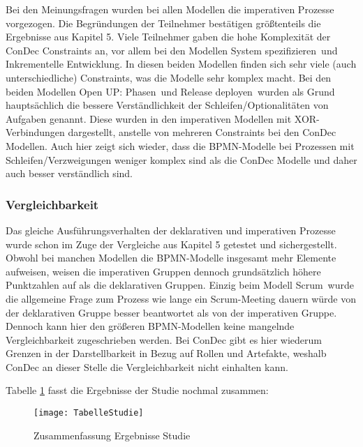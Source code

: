 Bei den Meinungsfragen wurden bei allen Modellen die imperativen Prozesse vorgezogen. Die Begründungen der Teilnehmer bestätigen größtenteils die Ergebnisse aus Kapitel 5. Viele Teilnehmer gaben die hohe Komplexität der ConDec Constraints an, vor allem bei den Modellen \grqq System spezifizieren\grqq \ und \grqq Inkrementelle Entwicklung\grqq. In diesen beiden Modellen finden sich sehr viele (auch unterschiedliche) Constraints, was die Modelle sehr komplex macht.\newline
Bei den beiden Modellen \grqq Open UP: Phasen\grqq \ und \grqq Release deployen\grqq \ wurden als Grund hauptsächlich die bessere Verständlichkeit der Schleifen/Optionalitäten von Aufgaben genannt. Diese wurden in den imperativen Modellen mit XOR-Verbindungen dargestellt, anstelle von mehreren Constraints bei den ConDec Modellen. Auch hier zeigt sich wieder, dass die BPMN-Modelle bei Prozessen mit Schleifen/Verzweigungen weniger komplex sind als die ConDec Modelle und daher auch besser verständlich sind.\newline


\subsubsection{Vergleichbarkeit}
Das gleiche Ausführungsverhalten der deklarativen und imperativen Prozesse wurde schon im Zuge der Vergleiche aus Kapitel 5 getestet und sichergestellt. \newline
Obwohl bei manchen Modellen die BPMN-Modelle insgesamt mehr Elemente aufweisen, weisen die imperativen Gruppen dennoch grundsätzlich höhere Punktzahlen auf als die deklarativen Gruppen. Einzig beim Modell \grqq Scrum\grqq \ wurde die allgemeine Frage zum Prozess wie lange ein Scrum-Meeting dauern würde von der deklarativen Gruppe besser beantwortet als von der imperativen Gruppe. Dennoch kann hier den größeren BPMN-Modellen keine mangelnde Vergleichbarkeit zugeschrieben werden.\newline
Bei ConDec gibt es hier wiederum Grenzen in der Darstellbarkeit in Bezug auf Rollen und Artefakte, weshalb ConDec an dieser Stelle die Vergleichbarkeit nicht einhalten kann.\newline


Tabelle \ref{fig:TabelleStudie} fasst die Ergebnisse der Studie nochmal zusammen:

\begin{figure}[htp]
\begin{center}
  \texttt{[image: TabelleStudie]} %
  \caption{Zusammenfassung Ergebnisse Studie}
  \label{fig:TabelleStudie}
\end{center}
\end{figure}

